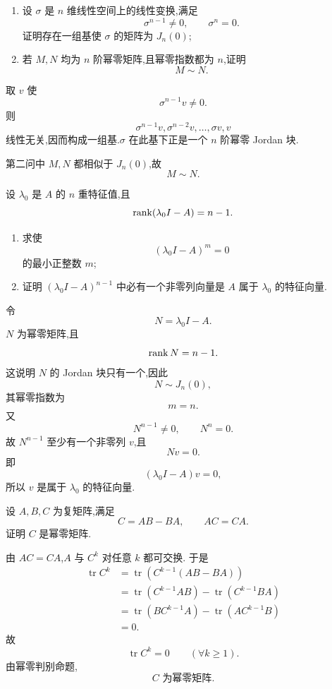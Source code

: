 \begin{example}
\begin{enumerate}
    \item 设 $\sigma$ 是 $n$ 维线性空间上的线性变换,满足
    \[
    \sigma^{n-1}\neq0,\qquad
    \sigma^n=0.
    \]
    证明存在一组基使 $\sigma$ 的矩阵为 $J_n(0)$;
    \item 若 $M,N$ 均为 $n$ 阶幂零矩阵,且幂零指数都为 $n$,证明
    \[
    M\sim N.
    \]
\end{enumerate}
\end{example}
\exampleblank

\begin{solution}
取 $v$ 使
\[
\sigma^{n-1}v\neq0.
\]
则
\[
\sigma^{n-1}v,\sigma^{n-2}v,\ldots,\sigma v,v
\]
线性无关,因而构成一组基.$\sigma$ 在此基下正是一个 $n$ 阶幂零
Jordan 块.

第二问中 $M,N$ 都相似于 $J_n(0)$,故
\[
\boxed{M\sim N}.
\]
\end{solution}


\begin{example}
设 $\lambda_0$ 是 $A$ 的 $n$ 重特征值,且
\[
\operatorname{rank}(\lambda_0I-A)=n-1.
\]
\begin{enumerate}
    \item 求使
    \[
    (\lambda_0I-A)^m=0
    \]
    的最小正整数 $m$;
    \item 证明 $(\lambda_0I-A)^{n-1}$ 中必有一个非零列向量是
    $A$ 属于 $\lambda_0$ 的特征向量.
\end{enumerate}
\end{example}
\exampleblank

\begin{solution}
令
\[
N=\lambda_0I-A.
\]
$N$ 为幂零矩阵,且
\[
\operatorname{rank} N=n-1.
\]
这说明 $N$ 的 Jordan 块只有一个,因此
\[
N\sim J_n(0),
\]
其幂零指数为
\[
\boxed{m=n}.
\]
又
\[
N^{n-1}\neq0,\qquad N^n=0.
\]
故 $N^{n-1}$ 至少有一个非零列 $v$,且
\[
Nv=0.
\]
即
\[
(\lambda_0I-A)v=0,
\]
所以 $v$ 是属于 $\lambda_0$ 的特征向量.
\end{solution}


\begin{example}
设 $A,B,C$ 为复矩阵,满足
\[
C=AB-BA,
\qquad
AC=CA.
\]
证明 $C$ 是幂零矩阵.
\end{example}
\exampleblank

\begin{solution}
由 $AC=CA$,$A$ 与 $C^k$ 对任意 $k$ 都可交换.
于是
\[
\begin{aligned}
\operatorname{tr}C^k
&=
\operatorname{tr}\left(C^{k-1}(AB-BA)\right)\\
&=
\operatorname{tr}(C^{k-1}AB)
-\operatorname{tr}(C^{k-1}BA)\\
&=
\operatorname{tr}(BC^{k-1}A)
-\operatorname{tr}(AC^{k-1}B)\\
&=0.
\end{aligned}
\]
故
\[
\operatorname{tr}C^k=0
\qquad(\forall k\geq1).
\]
由幂零判别命题,
\[
\boxed{C\text{ 为幂零矩阵}.}
\]
\end{solution}


